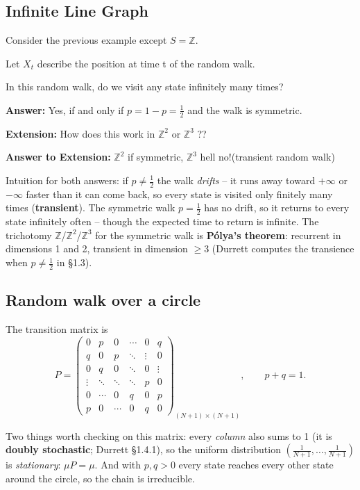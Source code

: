 \documentclass[11pt]{article}
\newcommand{\1}{\mathbf{1}}
\theoremstyle{notestyle}
\theoremstyle{definition}
\begin{document}
\subsection{Infinite Line Graph}
Consider the previous example except $S = \mathbb{Z}.$ \par Let $X_t$ describe the
position at time t of the random walk.
\par In this random walk, do we visit any state infinitely many times?
\par \textbf{Answer:} Yes, if and only if $p = 1 - p = \frac{1}{2}$ and the walk is symmetric.
\par \textbf{Extension: } How does this work in $\mathbb{Z}^2$ or $\mathbb{Z}^3$ ??
\par \textbf{Answer to Extension: } $\mathbb{Z}^2$ if symmetric, $\mathbb{Z}^3$ hell
no!(transient random walk)
\par Intuition for both answers: if $p \ne \frac{1}{2}$ the walk \emph{drifts} --
it runs away toward $+\infty$ or $-\infty$ faster than it can come back, so every
state is visited only finitely many times (\textbf{transient}). The symmetric walk
$p = \frac{1}{2}$ has no drift, so it returns to every state infinitely often --
though the expected time to return is infinite. The trichotomy
$\mathbb{Z}$/$\mathbb{Z}^2$/$\mathbb{Z}^3$ for the symmetric walk is
\textbf{P\'olya's theorem}: recurrent in dimensions 1 and 2, transient in dimension
$\ge 3$ (Durrett computes the transience when $p \neq \frac{1}{2}$ in \S1.3).
\subsection{Random walk over a circle}
The transition matrix is 
\[
P=
\begin{pmatrix}
0 & p & 0 & \cdots & 0 & q\\
q & 0 & p & \ddots & \vdots & 0\\
0 & q & 0 & \ddots & 0 & \vdots\\
\vdots & \ddots & \ddots & \ddots & p & 0\\
0 & \cdots & 0 & q & 0 & p\\
p & 0 & \cdots & 0 & q & 0
\end{pmatrix}_{(N+1)\times(N+1)},
\qquad p+q=1.
\]
\par Two things worth checking on this matrix: every \emph{column} also sums to 1
(it is \textbf{doubly stochastic}; Durrett \S1.4.1), so the uniform distribution
$(\frac{1}{N+1}, \dots, \frac{1}{N+1})$ is \emph{stationary}: $\mu P = \mu$. And
with $p, q > 0$ every state reaches every other state around the circle, so the
chain is irreducible.
\end{document}
